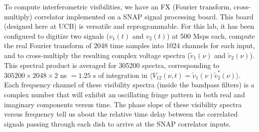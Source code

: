 \documentclass[11pt,preprint]{aastex}
\begin{document}
To compute interferometric visibilities, we 
have an FX (Fourier transform, cross-multiply) correlator implemented on a
SNAP signal processing board. This board (designed here at UCB) is versatile 
and reprogrammable. For this lab, it has been configured to digitize two signals ($v_1(t)$ and $v_2(t)$)
at 500 Msps each, compute the real Fourier transform of 2048 time samples into 1024 channels for each
input, and to cross-multiply
the resulting complex voltage spectra ($\tilde v_1(\nu)$ and $\tilde v_2(\nu)$).
 This spectral product is
averaged for 305200 spectra, corresponding to $305200\times2048\times2$ ns $=1.25$ s of integration
in $\langle V_{12}(\nu, t)=\tilde v_1(\nu) \tilde v_2^*(\nu)\rangle$.
Each frequency channel of these visibility spectra (inside the bandpass filters) is a complex number
that will exhibit an oscillating fringe pattern in both real and imaginary components versus time.
The phase slope of these visibility spectra versus frequency tell us about the relative time delay
between the correlated signals passing through each dish to arrive at the SNAP correlator inputs.
\end{document}

